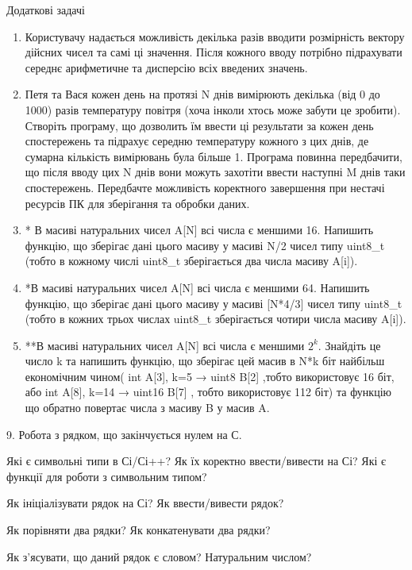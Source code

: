 \documentclass[]{article}
\begin{document}
Додаткові задачі

\begin{enumerate}
\def\labelenumi{\arabic{enumi})}
\item
  Користувачу надається можливість декілька разів вводити розмірність
  вектору дійсних чисел та самі ці значення. Після кожного вводу
  потрібно підрахувати середнє арифметичне та дисперсію всіх введених
  значень.
\item
  Петя та Вася кожен день на протязі
  \protect\hypertarget{__DdeLink__55546_11145444801}{}{}N днів вимірюють
  декілька (від 0 до 1000) разів температуру повітря (хоча інколи хтось
  може забути це зробити). Створіть програму, що дозволить їм ввести ці
  результати за кожен день спостережень та підрахує середню температуру
  кожного з цих днів, де сумарна кількість вимірювань була більше 1.
  Програма повинна передбачити, що після вводу цих N днів вони можуть
  захотіти ввести наступні M днів таки спостережень. Передбачте
  можливість коректного завершення при нестачі ресурсів ПК для
  зберігання та обробки даних.
\item
  * В масиві натуральних чисел A{[}N{]} всі числа є меншими 16. Напишить
  функцію, що зберігає дані цього масиву у масиві N/2 чисел типу
  uint8\_t (тобто в кожному числі uint8\_t зберігається два числа масиву
  A{[}i{]}).
\item
  *В масиві натуральних чисел A{[}N{]} всі числа є меншими 64. Напишить
  функцію, що зберігає дані цього масиву у масиві {[}N*4/3{]} чисел типу
  uint8\_t (тобто в кожних трьох числах uint8\_t зберігається чотири
  числа масиву A{[}i{]}).
\item
  **В масиві натуральних чисел A{[}N{]} всі числа є меншими \(2^{k}\).
  Знайдіть це число k та напишить функцію, що зберігає цей масив в N*k
  біт найбільш економічним чином( int A{[}3{]}, k=5 → uint8 B{[}2{]}
  ,тобто використовує 16 біт, або int A{[}8{]}, k=14 → uint16 B{[}7{]} ,
  тобто використовує 112 біт) та функцію що обратно повертає числа з
  масиву B у масив A.
\end{enumerate}

9. Робота з рядком, що закінчується нулем на С.

Які є символьні типи в Сі/Сі++? Як їх коректно ввести/вивести на Сі? Які
є функції для роботи з символьним типом?

Як ініціалізувати рядок на Сі? Як ввести/вивести рядок?

Як порівняти два рядки? Як конкатенувати два рядки?

Як з'ясувати, що даний рядок є словом? Натуральним числом?
\end{document}
